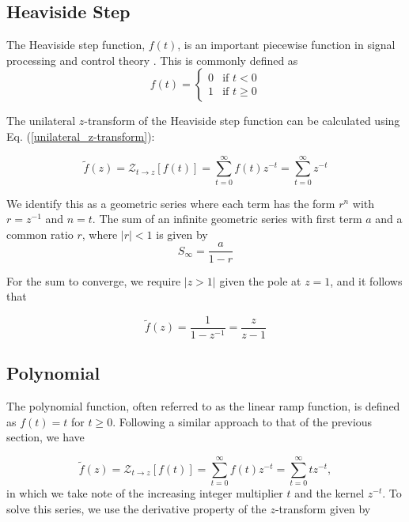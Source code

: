 \documentclass[a4paper]{report}
\begin{document}
\subsection{Heaviside Step}\label{section:heaviside_step}
The Heaviside step function, $f(t)$, is an important piecewise function in signal processing and control theory \citep{proakis2007digital}. This is commonly defined as
\begin{equation}
	f(t) = 
	\begin{cases}
        0 & \text{if } t < 0 \\
        1 & \text{if } t \geq 0
    \end{cases}
\end{equation}

The unilateral $z$-transform of the Heaviside step function can be calculated using Eq. (\ref{unilateral_z-transform}):

\begin{equation}
\tilde{f}(z) = 	\mathcal{Z}_{t \rightarrow z}[f(t)] = \sum^{\infty}_{t = 0}f(t)z^{-t} = \sum^{\infty}_{t=0} z^{-t}
\end{equation}

We identify this as a geometric series where each term has the form $r^n$ with $r = z^{-1}$ and $n = t$. The sum of an infinite geometric series with first term $a$ and a common ratio $r$, where $|r| < 1$ is given by
\begin{equation}\label{equation:geometric_series}
S_\infty = \frac{a}{1-r}	
\end{equation}

For the sum to converge, we require $|z > 1|$ given the pole at $z = 1$, and it follows that

\begin{equation}
\tilde{f}(z) = \frac{1}{1 - z^{-1}} = \frac{z}{z - 1}
\end{equation}

\subsection{Polynomial}\label{section:polynomial}
The polynomial function, often referred to as the linear ramp function, is defined as $f(t) = t$ for $t \geq 0	$. Following a similar approach to that of the previous section, we have

\begin{equation}
\tilde{f}(z) = 	\mathcal{Z}_{t \rightarrow z}[f(t)] = \sum^{\infty}_{t = 0}f(t)z^{-t} = \sum^{\infty}_{t=0} tz^{-t},
\end{equation}
in which we take note of the increasing integer multiplier $t$ and the kernel $z^{-t}$. To solve this series, we use the derivative property of the $z$-transform  given by
\end{document}
